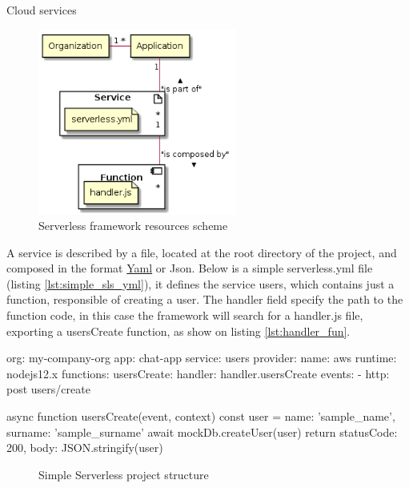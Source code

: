\begin{chapter}{Cloud services}
    \begin{figure}
        \centering
        \includegraphics[width=6.5cm]{source/diagrams/serverless_app_service.png}
        \caption{Serverless framework resources scheme}
        \label{fig:sls_resource_scheme}
    \end{figure}

    A service is described by a file, located at the root directory of the project,
    and composed in the format \href{https://yaml.org/}{Yaml} or Json.
    Below is a simple serverless.yml file (listing \ref{lst:simple_sls_yml}), it
    defines the service users, which contains just a function, responsible of creating
    a user. The handler field specify the path to the function code, in this case
    the framework will search for a handler.js file, exporting a usersCreate function,
    as show on listing \ref{lst:handler_fun}.

    \bigskip
    \begin{code}[caption=Simple serverless.yml file,
        label={lst:simple_sls_yml}, language=yaml]
org: my-company-org
app: chat-app
service: users
provider:
  name: aws
  runtime: nodejs12.x
functions:
  usersCreate:
    handler: handler.usersCreate
    events:
      - http: post users/create
    \end{code}

    \begin{code}[caption=Simple handler function,label={lst:handler_fun}]
async function usersCreate(event, context) {
  const user = {
    name: 'sample_name',
    surname: 'sample_surname'
  }
  await mockDb.createUser(user)
  return {
    statusCode: 200,
    body: JSON.stringify({user})
  }
}
    \end{code}

    \begin{figure}
        \begin{minipage}{\linewidth}
        \end{minipage}
        \caption{Simple Serverless project structure}
        \label{fig:sls_project_structure}
    \end{figure}


\end{chapter}
